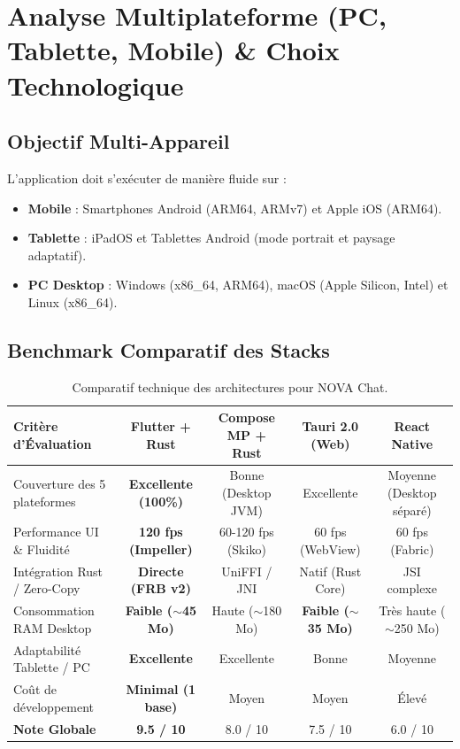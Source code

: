 \documentclass[11pt,a4paper]{article}
\begin{document}
\vspace{0.3cm}

\section{Analyse Multiplateforme (PC, Tablette, Mobile) \& Choix Technologique}

\subsection{Objectif Multi-Appareil}
L'application doit s'exécuter de manière fluide sur :
\begin{itemize}
    \item \textbf{Mobile} : Smartphones Android (ARM64, ARMv7) et Apple iOS (ARM64).
    \item \textbf{Tablette} : iPadOS et Tablettes Android (mode portrait et paysage adaptatif).
    \item \textbf{PC Desktop} : Windows (x86\_64, ARM64), macOS (Apple Silicon, Intel) et Linux (x86\_64).
\end{itemize}

\subsection{Benchmark Comparatif des Stacks}

\begin{table}[h!]
\centering
\small
\begin{tabularx}{\textwidth}{|l|c|c|c|c|}
\hline
\rowcolor{novasurface2!20} \textbf{Critère d'Évaluation} & \textbf{Flutter + Rust} & \textbf{Compose MP + Rust} & \textbf{Tauri 2.0 (Web)} & \textbf{React Native} \\ \hline
Couverture des 5 plateformes & \textbf{Excellente (100\%)} & Bonne (Desktop JVM) & Excellente & Moyenne (Desktop séparé) \\ \hline
Performance UI \& Fluidité & \textbf{120 fps (Impeller)} & 60-120 fps (Skiko) & 60 fps (WebView) & 60 fps (Fabric) \\ \hline
Intégration Rust / Zero-Copy & \textbf{Directe (FRB v2)} & UniFFI / JNI & Natif (Rust Core) & JSI complexe \\ \hline
Consommation RAM Desktop & \textbf{Faible ($\sim$45 Mo)} & Haute ($\sim$180 Mo) & \textbf{Faible ($\sim$35 Mo)} & Très haute ($\sim$250 Mo) \\ \hline
Adaptabilité Tablette / PC & \textbf{Excellente} & Excellente & Bonne & Moyenne \\ \hline
Coût de développement & \textbf{Minimal (1 base)} & Moyen & Moyen & Élevé \\ \hline
\textbf{Note Globale} & \textbf{9.5 / 10} & 8.0 / 10 & 7.5 / 10 & 6.0 / 10 \\ \hline
\end{tabularx}
\caption{Comparatif technique des architectures pour NOVA Chat.}
\end{table}
\end{document}
